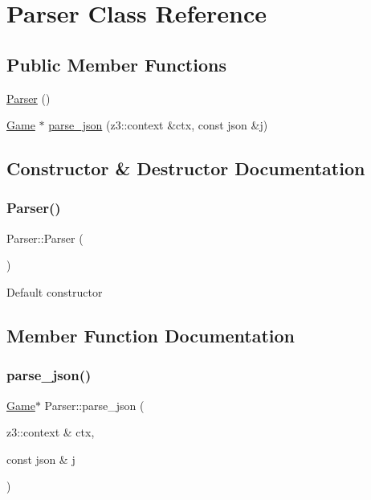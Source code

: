 \hypertarget{classParser}{}\section{Parser Class Reference}
\label{classParser}
\subsection*{Public Member Functions}
\begin{DoxyCompactItemize}
\item 
\hyperlink{classParser_a12234f6cd36b61af4b50c94a179422c1}{Parser} ()
\item 
\hyperlink{classGame}{Game} $\ast$ \hyperlink{classParser_ad674d7bfe64707d2805d31db5f3ca29f}{parse\+\_\+json} (z3\+::context \&ctx, const json \&j)
\end{DoxyCompactItemize}


\subsection{Constructor \& Destructor Documentation}
\mbox{\label{classParser_a12234f6cd36b61af4b50c94a179422c1}} 
\subsubsection{\texorpdfstring{Parser()}{Parser()}}
{\footnotesize\ttfamily Parser\+::\+Parser (\begin{DoxyParamCaption}{ }\end{DoxyParamCaption})\hspace{0.3cm}{\ttfamily [inline]}}

Default constructor 

\subsection{Member Function Documentation}
\mbox{\label{classParser_ad674d7bfe64707d2805d31db5f3ca29f}} 
\subsubsection{\texorpdfstring{parse\+\_\+json()}{parse\_json()}}
{\footnotesize\ttfamily \hyperlink{classGame}{Game}$\ast$ Parser\+::parse\+\_\+json (\begin{DoxyParamCaption}\item[{z3\+::context \&}]{ctx,  }\item[{const json \&}]{j }\end{DoxyParamCaption})\hspace{0.3cm}{\ttfamily [inline]}}

